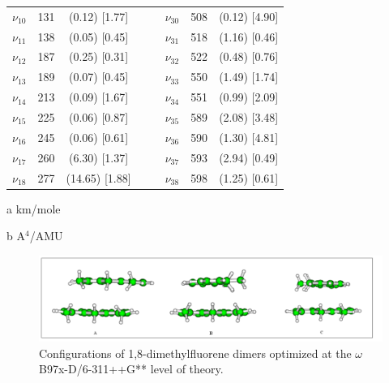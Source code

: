 \begin{table}[H]
\begin{center}
\begin{threeparttable}
\begin{tabular}{c c c c c c c c}
$\nu_{10}$& 131 & (0.12)  [1.77] &  &    & $\nu_{30}$ & 508 & (0.12)  [4.90] \\ 
$\nu_{11}$&  138 & (0.05)  [0.45] &  &    & $\nu_{31}$ & 518 & (1.16)  [0.46] \\ 
$\nu_{12}$&  187 & (0.25)  [0.31] &  &    & $\nu_{32}$ & 522 & (0.48)  [0.76] \\ 
$\nu_{13}$&  189 & (0.07)  [0.45] &  &    & $\nu_{33}$ & 550 & (1.49)  [1.74] \\ 
$\nu_{14}$&  213 & (0.09)  [1.67] &  &    & $\nu_{34}$ & 551 & (0.99)  [2.09] \\ 
$\nu_{15}$&  225 & (0.06)  [0.87] &  &    & $\nu_{35}$ & 589 & (2.08)  [3.48] \\ 
$\nu_{16}$&  245 & (0.06)  [0.61] &  &    & $\nu_{36}$ & 590 & (1.30)  [4.81] \\ 
$\nu_{17}$&  260 & (6.30)  [1.37] &  &    & $\nu_{37}$ & 593 & (2.94)  [0.49] \\ 
$\nu_{18}$&  277 & (14.65)  [1.88] &  &   & $\nu_{38}$ & 598 & (1.25)  [0.61] \\ 
	\bottomrule
\end{tabular}

\begin{tablenotes}
	\item[a] km/mole
	\item[b] A$^{4}$/AMU
\end{tablenotes}
\end{threeparttable}
\end{center}
\label{lowfreq-1-methylflDi}
\end{table}	





\begin{figure}[H]
	\begin{center}
	\includegraphics[scale=0.9]{image/18MCC}	
	\end{center}
	\caption{ Configurations of 1,8-dimethylfluorene dimers optimized at the $\omega$B97x-D/6-311++G** level of theory. }
\end{figure}


